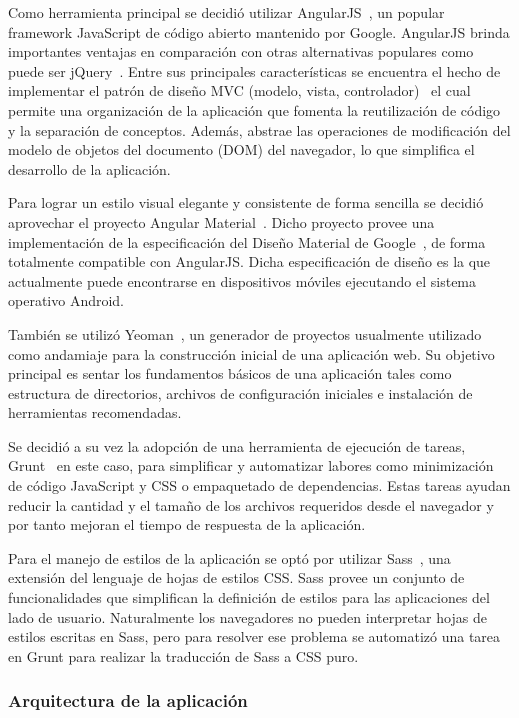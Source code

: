 Como herramienta principal se decidió utilizar AngularJS~\cite{AngularJS}, un popular framework JavaScript
de código abierto mantenido por Google. AngularJS brinda importantes ventajas en comparación con otras
alternativas populares como puede ser jQuery~\cite{jQuery}. Entre sus principales características se
encuentra el hecho de implementar el patrón de diseño MVC (modelo, vista, controlador)~\cite{Leff2001} el
cual permite una organización de la aplicación que fomenta la reutilización de código y la separación de
conceptos. Además, abstrae las operaciones de modificación del modelo de objetos del documento (DOM) del
navegador, lo que simplifica el desarrollo de la aplicación.

Para lograr un estilo visual elegante y consistente de forma sencilla se decidió aprovechar el proyecto
Angular Material~\cite{AngularMaterial}. Dicho proyecto provee una implementación de la especificación del
Diseño Material de Google~\cite{MaterialDesign}, de forma totalmente compatible con AngularJS. Dicha
especificación de diseño es la que actualmente puede encontrarse en dispositivos móviles ejecutando el
sistema operativo Android.

También se utilizó Yeoman~\cite{Yeoman}, un generador de proyectos usualmente utilizado como andamiaje
para la construcción inicial de una aplicación web. Su objetivo principal es sentar los fundamentos básicos
de una aplicación tales como estructura de directorios, archivos de configuración iniciales e instalación
de herramientas recomendadas.

Se decidió a su vez la adopción de una herramienta de ejecución de tareas, Grunt~\cite{Grunt} en este caso,
para simplificar y automatizar labores como minimización de código JavaScript y CSS o empaquetado de
dependencias. Estas tareas ayudan reducir la cantidad y el tamaño de los archivos requeridos desde el
navegador y por tanto mejoran el tiempo de respuesta de la aplicación.

Para el manejo de estilos de la aplicación se optó por utilizar Sass~\cite{Sass}, una extensión del lenguaje
de hojas de estilos CSS. Sass provee un conjunto de funcionalidades que simplifican la definición de
estilos para las aplicaciones del lado de usuario. Naturalmente los navegadores no pueden interpretar
hojas de estilos escritas en Sass, pero para resolver ese problema se automatizó una tarea en Grunt para
realizar la traducción de Sass a CSS puro.

\subsubsection{Arquitectura de la aplicación}

